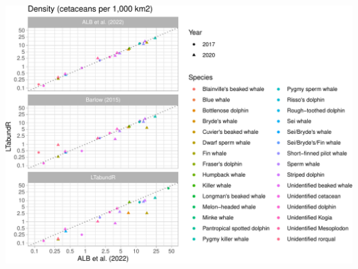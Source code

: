 \documentclass[
]{book}
\begin{document}
\includegraphics{figures/unnamed-chunk-386-1.pdf}

~
\end{document}

